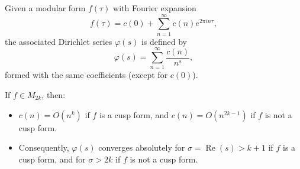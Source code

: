 Given a modular form $f(\tau)$ with Fourier expansion
$$f(\tau) = c(0) + \sum_{n=1}^{\infty} c(n)e^{2\pi i n\tau},$$
the associated Dirichlet series $\varphi(s)$ is defined by
$$\varphi(s) = \sum_{n=1}^{\infty} \frac{c(n)}{n^s},$$
formed with the same coefficients (except for $c(0)$).

If $f \in M_{2k}$, then:
\begin{itemize}
\item $c(n) = O(n^k)$ if $f$ is a cusp form, and $c(n) = O(n^{2k-1})$ if $f$ is not a cusp form.
\item Consequently, $\varphi(s)$ converges absolutely for $\sigma = \operatorname{Re}(s) > k + 1$ if $f$ is a cusp form, and for $\sigma > 2k$ if $f$ is not a cusp form.
\end{itemize}
